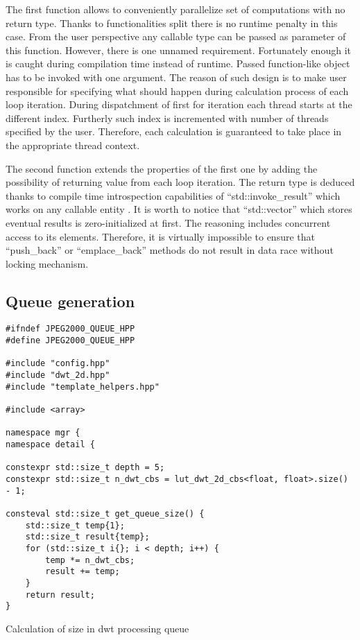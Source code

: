 The first function allows to conveniently parallelize set of computations with no return type.
Thanks to functionalities split there is no runtime penalty in this case. From the user perspective
any callable type can be passed as parameter of this function. However, there is one unnamed
requirement. Fortunately enough it is caught during compilation time instead of runtime. Passed
function-like object has to be invoked with one argument. The reason of such design is to
make user responsible for specifying what should happen during calculation process of each
loop iteration. During dispatchment of first for iteration each thread starts at the different index.
Furtherly such index is incremented with number of threads specified by the user. Therefore,
each calculation is guaranteed to take place in the appropriate thread context.

The second function extends the properties of the first one by adding the possibility of returning
value from each loop iteration. The return type is deduced thanks to compile time introspection
capabilities of ``std::invoke\_result'' which works on any callable entity \cite{cppreference}. 
It is worth to notice that ``std::vector'' which stores eventual results is zero-initialized
at first. The reasoning includes concurrent access to its elements. Therefore, it is virtually
impossible to ensure that ``push\_back'' or ``emplace\_back'' methods do not result in data race
without locking mechanism.


\subsection{Queue generation}

\begin{listing}[htb]
\begin{verbatim}
#ifndef JPEG2000_QUEUE_HPP
#define JPEG2000_QUEUE_HPP

#include "config.hpp"
#include "dwt_2d.hpp"
#include "template_helpers.hpp"

#include <array>

namespace mgr {
namespace detail {

constexpr std::size_t depth = 5;
constexpr std::size_t n_dwt_cbs = lut_dwt_2d_cbs<float, float>.size() - 1;

consteval std::size_t get_queue_size() {
    std::size_t temp{1};
    std::size_t result{temp};
    for (std::size_t i{}; i < depth; i++) {
        temp *= n_dwt_cbs;
        result += temp;
    }
    return result;
}
\end{verbatim}
\caption{Calculation of size in dwt processing queue}
\label{lst:dwt_queue_size}
\end{listing}

